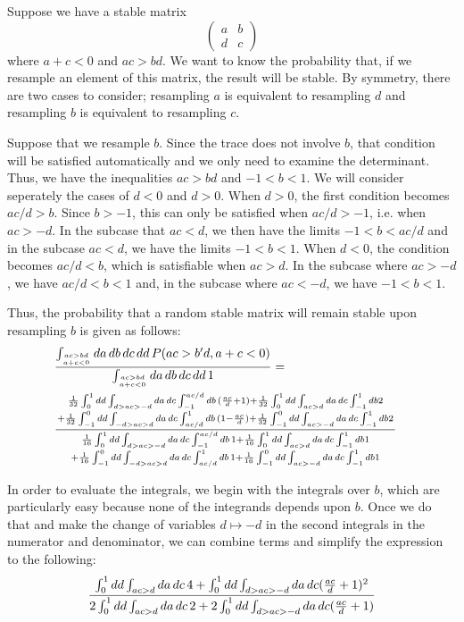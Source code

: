 \documentclass{amsart}
\theoremstyle{definition}
\theoremstyle{remark}
\numberwithin{equation}{section}
\begin{document}
Suppose we have a stable matrix
$$
\begin{pmatrix}
a & b \\
d & c
\end{pmatrix}
$$
where $a + c < 0$ and $ac > bd$.  We want to know the probability
that, if we resample an element of this matrix, the result will be
stable.  By symmetry, there are two cases to consider; resampling
$a$ is equivalent to resampling $d$ and resampling $b$ is equivalent
to resampling $c$.

Suppose that we resample $b$.  Since the trace does not involve $b$,
that condition will be satisfied automatically and we only need to
examine the determinant.  Thus, we have the inequalities $ac > bd$ and $-1 < b < 1$.  We will consider seperately the cases of $d
< 0$ and $d > 0$.  When $d > 0$, the first condition becomes $ac/d > b$.
Since $b > -1$, this can only be satisfied when $ac/d > -1$, i.e. when $ac > -d$.  In the subcase that $ac < d$, we then have the limits $-1 < b < ac/d$ and in the subcase $ac < d$, we have the limits $-1 < b < 1$.  When $d < 0$, the condition becomes
$ac/d < b$, which is satisfiable when $ac > d$.  In the subcase where $ac > -d$, we have $ac/d < b < 1$ and, in the subcase where $ac < -d$, we have $-1 < b <
1$.

Thus, the probability that a random stable matrix will remain stable
upon resampling $b$ is given as follows:
\begin{align*}
&{\int_{ac>bd \atop a+c<0} da\,db\,dc\,dd\,
  P(ac>b'd, a+c < 0) \over
\int_{ac>bd \atop a+c<0} da\,db\,dc\,dd\,1} = \cr
&{{{1 \over 32} \int_0^1 dd \int_{d > ac > -d} da\,dc \int_{-1}^{ac/d} db \,
({ac \over d} + 1) + {1 \over 32} \int_{0}^{1} dd \int_{ac>d} da\,dc \int_{-1}^{1} db 2 \atop +
{1 \over 32} \int_{-1}^0 dd \int_{-d > ac > d} da\,dc \int_{ac/d}^1 db\, (1
- {ac \over d}) + {1 \over 32} \int_{-1}^{0} dd \int_{ac>-d} da\,dc \int_{-1}^{1} db 2}
\over
{{{1 \over 16} \int_0^1 dd \int_{d > ac > -d} da\,dc \int_{-1}^{ac/d} db\,1
+ {1 \over 16} \int_{0}^{1} dd \int_{ac>d} da\,dc \int_{-1}^{1} db 1} \atop
{+ {1 \over 16} \int_{-1}^0 dd \int_{-d > ac > d} da\,dc \int_{ac/d}^1 db\,1} + {1 \over 16} \int_{-1}^{0} dd \int_{ac>-d} da\,dc \int_{-1}^{1} db 1}}
\end{align*}

In order to evaluate the integrals, we begin with the
integrals over $b$, which are particularly easy because none of the
integrands depends upon $b$.  Once we do that and make the change of
variables $d \mapsto -d$ in the second integrals in the numerator and
denominator, we can combine terms and simplify the expression to the
following:
$$
\frac{\int_0^1 dd \int_{ac > d} da\,dc\, 4 + \int_0^1 dd \int_{d > ac > -d} da\,dc ({ac \over d} + 1)^2}{2 \int_0^1 dd \int_{ac > d} da\,dc\, 2 + 2 \int_0^1 dd \int_{d > ac > -d} da\,dc ({ac \over d} + 1)}
$$
\end{document}
